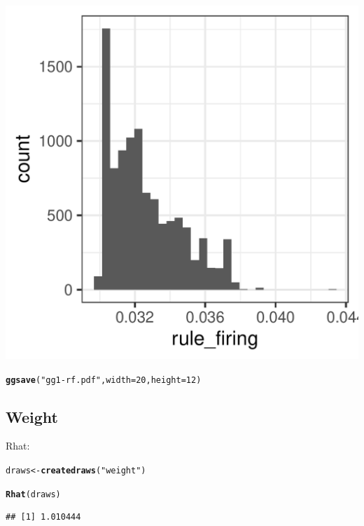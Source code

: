 \documentclass{article}\usepackage[]{graphicx}\usepackage[]{color}
\makeatletter
\def\maxwidth{ %
  \ifdim\Gin@nat@width>\linewidth
    \linewidth
  \else
    \Gin@nat@width
  \fi
}
\newcommand{\hlnum}[1]{\textcolor[rgb]{0.686,0.059,0.569}{#1}}%
\newcommand{\hlstr}[1]{\textcolor[rgb]{0.192,0.494,0.8}{#1}}%
\newcommand{\hlstd}[1]{\textcolor[rgb]{0.345,0.345,0.345}{#1}}%
\newcommand{\hlkwb}[1]{\textcolor[rgb]{0.69,0.353,0.396}{#1}}%
\newcommand{\hlkwc}[1]{\textcolor[rgb]{0.333,0.667,0.333}{#1}}%
\newcommand{\hlkwd}[1]{\textcolor[rgb]{0.737,0.353,0.396}{\textbf{#1}}}%
\newenvironment{kframe}{%
 \def\at@end@of@kframe{}%
 \ifinner\ifhmode%
  \def\at@end@of@kframe{\end{minipage}}%
  \begin{minipage}{\columnwidth}%
 \fi\fi%
 \def\FrameCommand##1{\hskip\@totalleftmargin \hskip-\fboxsep
 \colorbox{shadecolor}{##1}\hskip-\fboxsep
     \hskip-\linewidth \hskip-\@totalleftmargin \hskip\columnwidth}%
 \MakeFramed {\advance\hsize-\width
   \@totalleftmargin\z@ \linewidth\hsize
   \@setminipage}}%
 {\par\unskip\endMakeFramed%
 \at@end@of@kframe}
\newenvironment{knitrout}{}{} %
\makeatother
\begin{document}
\begin{knitrout}
\begin{kframe}
{\ttfamily\noindent\itshape\color{messagecolor}{\#\# `stat\_bin()` using `bins = 30`. Pick better value with `binwidth`.}}\end{kframe}
\includegraphics[width=\maxwidth]{figures/figure7regionsunnamed-chunk-17-1} 
\begin{kframe}\begin{alltt}
\hlkwd{ggsave}\hlstd{(}\hlstr{"gg1-rf.pdf"}\hlstd{,} \hlkwc{width} \hlstd{=} \hlnum{20}\hlstd{,} \hlkwc{height} \hlstd{=} \hlnum{12}\hlstd{)}
\end{alltt}


{\ttfamily\noindent\itshape\color{messagecolor}{\#\# `stat\_bin()` using `bins = 30`. Pick better value with `binwidth`.}}\end{kframe}
\end{knitrout}

\subsection{Weight}

Rhat:
\begin{knitrout}
\color{fgcolor}\begin{kframe}
\begin{alltt}
\hlstd{draws} \hlkwb{<-} \hlkwd{createdraws}\hlstd{(}\hlstr{"weight"}\hlstd{)}

\hlkwd{Rhat}\hlstd{(draws)}
\end{alltt}
\begin{verbatim}
## [1] 1.010444
\end{verbatim}
\end{kframe}
\end{knitrout}
\end{document}
